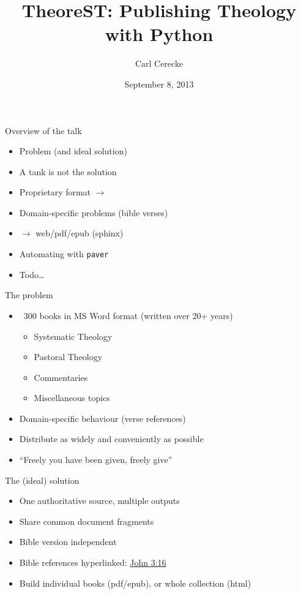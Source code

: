 \documentclass{beamer}
\title{TheoreST: Publishing Theology with Python}
\author{Carl Cerecke}
\institute{Evangelical Bible College of Western Australia}
\date{September 8, 2013}
\begin{document}
    \begin{frame}[plain]
        \titlepage
    \end{frame}

\begin{frame}{Overview of the talk}
    \begin{itemize}
    \item Problem (and ideal solution)
    \item A tank is not the solution
    \item Proprietary format $\rightarrow$ \rst
    \item Domain-specific problems (bible verses)
    \item \rst $\rightarrow$ web/pdf/epub (sphinx)
    \item Automating with \texttt{paver}
    \item Todo\ldots
    \end{itemize}
\end{frame}
    
\begin{frame}{The problem}
    \begin{itemize}
    \item ~300 books in MS Word format (written over 20+ years)
        \begin{itemize}
        \item Systematic Theology
        \item Pastoral Theology
        \item Commentaries
        \item Miscellaneous topics 
        \end{itemize}
    \item Domain-specific behaviour (verse references)
    \item Distribute as widely and conveniently as possible
    \item ``Freely you have been given, freely give''
    \end{itemize}
\end{frame}
    
\begin{frame}{The (ideal) solution}
\begin{itemize}
    \item One authoritative source, multiple outputs
    \item Share common document fragments
    \item Bible version independent
    \item Bible references hyperlinked: \href{http://some.url}{John 3:16}
    \item Build individual books (pdf/epub), or whole collection (html)
\end{itemize}
\end{frame}
\end{document}
